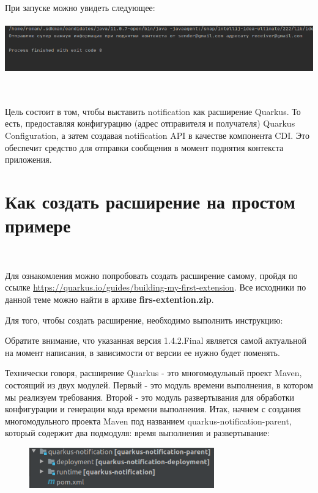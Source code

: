 \documentclass[russian,11pt]{article}
\begin{document}
При запуске можно увидеть следующее:

\paragraph{\includegraphics[scale=1.5, width=\textwidth]{2}}

~

Цель состоит в том, чтобы выставить notification как расширение Quarkus. То есть, предоставляя конфигурацию (адрес отправителя и получателя) Quarkus Configuration, а затем создавая notification  API в качестве компонента CDI. Это обеспечит средство для отправки сообщения в момент поднятия контекста приложения.

\section{Как создать расширение на простом примере}
~

Для ознакомления можно попробовать создать расширение самому, пройдя по ссылке \url{https://quarkus.io/guides/building-my-first-extension}. Все исходники по данной теме можно найти в архиве \textbf{firs-extention.zip}.
	
	Для того, чтобы создать расширение, необходимо выполнить инструкцию:



Обратите внимание, что указанная версия 1.4.2.Final является самой актуальной на момент написания, в зависимости от версии ее нужно будет поменять.

	Технически говоря, расширение Quarkus - это многомодульный проект Maven, состоящий из двух модулей. Первый - это модуль времени выполнения, в котором мы реализуем требования. Второй - это модуль развертывания для обработки конфигурации и генерации кода времени выполнения. Итак, начнем с создания многомодульного проекта Maven под названием quarkus-notification-parent, который содержит два подмодуля: время выполнения и развертывание:

\begin{figure}[H]
	\centering
	\includegraphics[scale=1, width=8cm]{3}
\end{figure}
\end{document}
